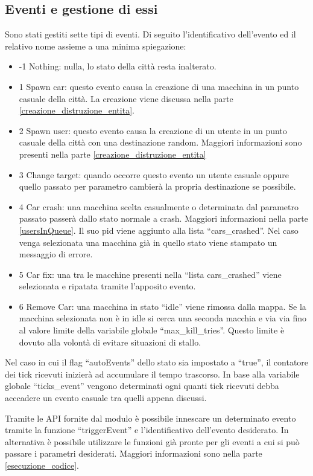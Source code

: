 \subsection{Eventi e gestione di essi}\label{env_events}
Sono stati gestiti sette tipi di eventi. Di seguito l'identificativo dell'evento ed il relativo nome assieme a una minima spiegazione:
\begin{itemize}
	\item -1 Nothing: nulla, lo stato della città resta inalterato.
	\item 1 Spawn car: questo evento causa la creazione di una macchina in un punto casuale della città. La creazione viene discussa nella parte \ref{creazione_distruzione_entita}.
	\item 2 Spawn user: questo evento causa la creazione di un utente in un punto casuale della città con una destinazione random. Maggiori informazioni sono presenti nella parte \ref{creazione_distruzione_entita}
	\item 3 Change target: quando occorre questo evento un utente casuale oppure quello passato per parametro cambierà la propria destinazione se possibile.
	\item 4 Car crash: una macchina scelta casualmente o determinata dal parametro passato passerà dallo stato normale a crash. Maggiori informazioni nella parte \ref{usersInQueue}. Il suo pid viene aggiunto alla lista ``cars\_crashed''. Nel caso venga selezionata una macchina già in quello stato viene stampato un messaggio di errore.
	\item 5 Car fix: una tra le macchine presenti nella ``lista cars\_crashed'' viene selezionata e ripatata tramite l'apposito evento. 
	\item 6 Remove Car: una macchina in stato ``idle'' viene rimossa dalla mappa. Se la macchina selezionata non è in idle si cerca una seconda macchia e via via fino al valore limite della variabile globale ``max\_kill\_tries''. Questo limite è dovuto alla volontà di evitare situazioni di stallo.
\end{itemize}

Nel caso in cui il flag ``autoEvents'' dello stato sia impostato a ``true'', il contatore dei tick ricevuti inizierà ad accumulare il tempo trascorso. In base alla variabile globale ``ticks\_event'' vengono determinati ogni quanti tick ricevuti debba acccadere un evento casuale tra quelli appena discussi.

Tramite le API fornite dal modulo è possibile innescare un determinato evento tramite la funzione ``triggerEvent'' e l'identificativo dell'evento desiderato. In alternativa è possibile utilizzare le funzioni già pronte per gli eventi a cui si può passare i parametri desiderati. Maggiori informazioni sono nella parte \ref{esecuzione_codice}.

